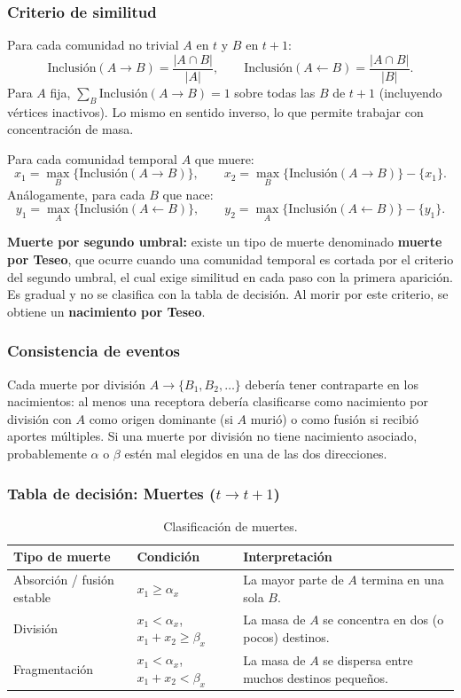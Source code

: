 \documentclass[12pt]{article}
\begin{document}
\subsubsection*{Criterio de similitud}
Para cada comunidad no trivial $A$ en $t$ y $B$ en $t+1$:
\[
\text{Inclusión}(A \to B) = \frac{|A \cap B|}{|A|},
\qquad
\text{Inclusión}(A \leftarrow B) = \frac{|A \cap B|}{|B|}.
\]
Para $A$ fija, $\sum_B \text{Inclusión}(A \to B) = 1$ sobre todas las $B$ de $t+1$ (incluyendo vértices inactivos). Lo mismo en sentido inverso, lo que permite trabajar con concentración de masa.

Para cada comunidad temporal $A$ que muere:
\[
x_1 = \max_B\{\text{Inclusión}(A \to B)\},
\qquad
x_2 = \max_B\{\text{Inclusión}(A \to B)\} - \{x_1\}.
\]
Análogamente, para cada $B$ que nace:
\[
y_1 = \max_A\{\text{Inclusión}(A \leftarrow B)\},
\qquad
y_2 = \max_A\{\text{Inclusión}(A \leftarrow B)\} - \{y_1\}.
\]

\textbf{Muerte por segundo umbral:} existe un tipo de muerte denominado \textbf{muerte por Teseo}, que ocurre cuando una comunidad temporal es cortada por el criterio del segundo umbral, el cual exige similitud en cada paso con la primera aparición. Es gradual y no se clasifica con la tabla de decisión. Al morir por este criterio, se obtiene un \textbf{nacimiento por Teseo}.

\subsubsection*{Consistencia de eventos}
Cada muerte por división $A \to \{B_1, B_2, \dots\}$ debería tener contraparte en los nacimientos: al menos una receptora debería clasificarse como nacimiento por división con $A$ como origen dominante (si $A$ murió) o como fusión si recibió aportes múltiples. Si una muerte por división no tiene nacimiento asociado, probablemente $\alpha$ o $\beta$ estén mal elegidos en una de las dos direcciones.

\subsubsection*{Tabla de decisión: Muertes ($t \to t+1$)}
\begin{table}[H]
\centering
\caption{Clasificación de muertes.}
\begin{tabular}{@{}p{} p{} p{}@{}}
\toprule
\textbf{Tipo de muerte} & \textbf{Condición} & \textbf{Interpretación} \\
\midrule
Absorción / fusión estable & $x_1 \geq \alpha_x$ & La mayor parte de $A$ termina en una sola $B$. \\
\addlinespace
División & $x_1 < \alpha_x$, $x_1+x_2 \geq \beta_x$ & La masa de $A$ se concentra en dos (o pocos) destinos. \\
\addlinespace
Fragmentación & $x_1 < \alpha_x$, $x_1+x_2 < \beta_x$ & La masa de $A$ se dispersa entre muchos destinos pequeños. \\
\bottomrule
\end{tabular}
\end{table}
\end{document}
